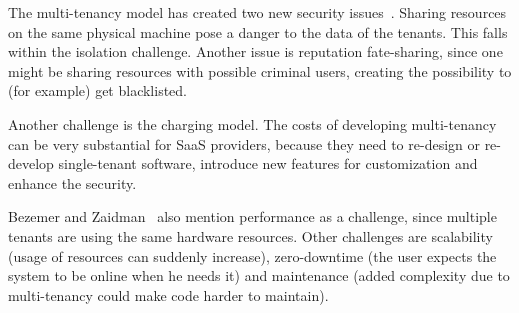 The multi-tenancy model has created two new security issues~\cite{dillon2010cloud}. Sharing resources on the same physical machine pose a danger to the data of the tenants. This falls within the isolation challenge. Another issue is reputation fate-sharing, since one might be sharing resources with possible criminal users, creating the possibility to (for example) get blacklisted.

Another challenge is the charging model. The costs of developing multi-tenancy can be very substantial for \ac{SaaS} providers, because they need to re-design or re-develop single-tenant software, introduce new features for customization and enhance the security. %

Bezemer and Zaidman~\cite{bezemer2010multi} also mention performance as a challenge, since multiple tenants are using the same hardware resources. Other challenges are scalability (usage of resources can suddenly increase), zero-downtime (the user expects the system to be online when he needs it) and maintenance (added complexity due to multi-tenancy could make code harder to maintain).